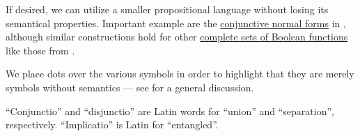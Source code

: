 \begin{comments}
  \item If desired, we can utilize a smaller propositional language without losing its semantical properties. Important example are the \hyperref[def:cnf_and_dnf]{conjunctive normal forms} in , although similar constructions hold for other \hyperref[def:boolean_closure/complete]{complete sets of Boolean functions} like those from .

  \item We place dots over the various symbols in order to highlight that they are merely symbols without semantics --- see  for a general discussion.

  \item \enquote{Conjunctio} and \enquote{disjunctio} are Latin words for \enquote{union} and \enquote{separation}, respectively. \enquote{Implicatio} is Latin for \enquote{entangled}.
\end{comments}

